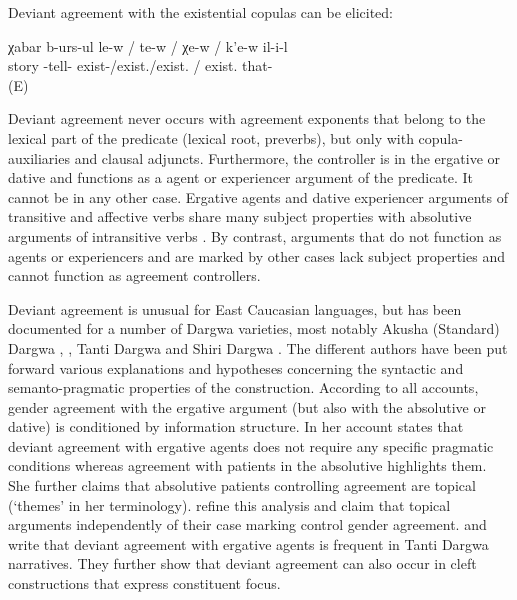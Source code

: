 Deviant agreement with the existential copulas can be elicited:

\begin{exe}
	\ex	\label{ex:telling a storyLOCCOP}
	\gll	χabar	b-urs-ul	le-w	/	te-w	/	χe-w	/	k'e-w	il-i-l\\
		story	-tell-	exist-\slash 	exist.\slash 	exist.	/	exist.	that-\\
	\glt	{} (E)
\end{exe}


Deviant agreement never occurs with agreement exponents that belong to the lexical part of the predicate (lexical root, preverbs), but only with copula-auxiliaries and clausal adjuncts. Furthermore, the controller is in the ergative or dative and functions as a agent or experiencer argument of the predicate. It cannot be in any other case. Ergative agents and dative experiencer arguments of transitive and affective verbs share many subject properties with absolutive arguments of intransitive verbs \citet{Forker2017, Forker2019}. By contrast, arguments that do not function as agents or experiencers and are marked by other cases lack subject properties and cannot function as agreement controllers.

Deviant agreement is unusual for East Caucasian languages, but has been documented for a number of Dargwa varieties, most notably Akusha (Standard) Dargwa \citet{vandenBerg1999}, \citet{GanenkovForthcoming}, Tanti Dargwa \citet[450]{Sumbatova.Lander2014} and Shiri Dargwa \citet{Belyaev2016, Belyaev2017a, Belyaev2017b}. The different authors have been put forward various explanations and hypotheses concerning the syntactic and semanto-pragmatic properties of the construction. According to all accounts, gender agreement with the ergative argument (but also with the absolutive or dative) is conditioned by information structure. In her account \citet{vandenBerg1999} states that deviant agreement with ergative agents does not require any specific pragmatic conditions whereas agreement with patients in the absolutive highlights them. She further claims that absolutive patients controlling agreement are topical (‘themes' in her terminology). \citet{Sumbatova.Lander2014} refine this analysis and claim that topical arguments independently of their case marking control gender agreement. \citet{Sumbatova2010} and \citet{Sumbatova.Lander2014} write that deviant agreement with ergative agents is frequent in Tanti Dargwa narratives. They further show that deviant agreement can also occur in cleft constructions that express constituent focus.




